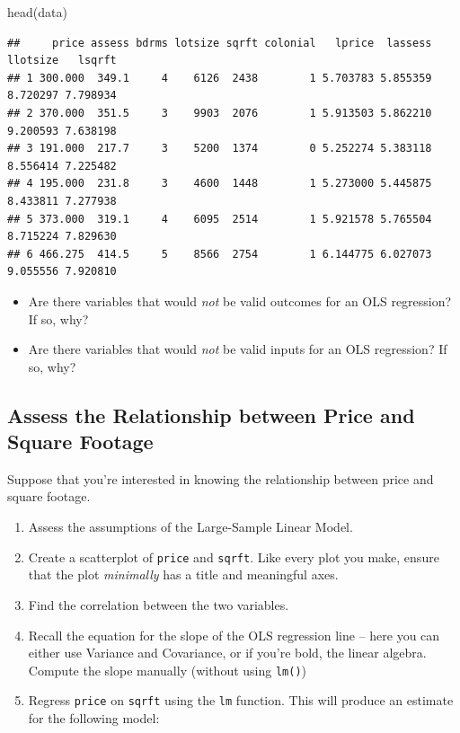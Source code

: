 \documentclass[
]{book}
\newenvironment{Shaded}{\begin{snugshade}}{\end{snugshade}}
\newcommand{\FunctionTok}[1]{\textcolor[rgb]{0.00,0.00,0.00}{#1}}
\newcommand{\NormalTok}[1]{#1}
\providecommand{\tightlist}{%
  \setlength{\itemsep}{0pt}\setlength{\parskip}{0pt}}
\theoremstyle{definition}
\theoremstyle{definition}
\theoremstyle{definition}
\theoremstyle{definition}
\theoremstyle{remark}
\begin{document}
\begin{Shaded}
\begin{Highlighting}[]
\FunctionTok{head}\NormalTok{(data)}
\end{Highlighting}
\end{Shaded}

\begin{verbatim}
##     price assess bdrms lotsize sqrft colonial   lprice  lassess llotsize   lsqrft
## 1 300.000  349.1     4    6126  2438        1 5.703783 5.855359 8.720297 7.798934
## 2 370.000  351.5     3    9903  2076        1 5.913503 5.862210 9.200593 7.638198
## 3 191.000  217.7     3    5200  1374        0 5.252274 5.383118 8.556414 7.225482
## 4 195.000  231.8     3    4600  1448        1 5.273000 5.445875 8.433811 7.277938
## 5 373.000  319.1     4    6095  2514        1 5.921578 5.765504 8.715224 7.829630
## 6 466.275  414.5     5    8566  2754        1 6.144775 6.027073 9.055556 7.920810
\end{verbatim}

\begin{itemize}
\tightlist
\item
  Are there variables that would \emph{not} be valid outcomes for an OLS regression? If so, why?
\item
  Are there variables that would \emph{not} be valid inputs for an OLS regression? If so, why?
\end{itemize}

\hypertarget{assess-the-relationship-between-price-and-square-footage}{%
\subsection{Assess the Relationship between Price and Square Footage}\label{assess-the-relationship-between-price-and-square-footage}}

Suppose that you're interested in knowing the relationship between price and square footage.

\begin{enumerate}
\def\labelenumi{\arabic{enumi}.}
\setcounter{enumi}{-1}
\item
  Assess the assumptions of the Large-Sample Linear Model.
\item
  Create a scatterplot of \texttt{price} and \texttt{sqrft}. Like every plot you make, ensure that the plot \emph{minimally} has a title and meaningful axes.
\item
  Find the correlation between the two variables.
\item
  Recall the equation for the slope of the OLS regression line -- here you can either use Variance and Covariance, or if you're bold, the linear algebra. Compute the slope manually (without using \texttt{lm()})
\item
  Regress \texttt{price} on \texttt{sqrft} using the \texttt{lm} function. This will produce an estimate for the following model:
\end{enumerate}
\end{document}
